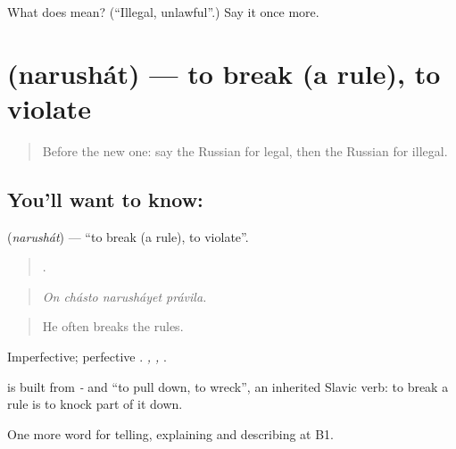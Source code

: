 \begin{tcolorbox}[breakable,colback=teal!4,colframe=teal!35!black,title={Before you move on}]
What does  mean? (\textquotedblleft{}Illegal, unlawful\textquotedblright{}.) Say it once more.
\end{tcolorbox}
\section[\texorpdfstring{\ru{нарушать} (narushát)}{нарушать (narushát)}]{ (narushát) — to break (a rule), to violate}

\label{lesson:RU-C388-narushat}



\begin{quote}
Before the new one: say the Russian for legal, then the Russian for illegal.
\end{quote}

\subsection*{You'll want to know: }
\textbf{} (\emph{narushát}) — \textquotedblleft{}to break (a rule), to violate\textquotedblright{}.

\begin{quote}
   .
\end{quote}

\begin{quote}
\emph{On chásto narusháyet právila.}
\end{quote}

\begin{quote}
He often breaks the rules.
\end{quote}

Imperfective; perfective \emph{}. \emph{ , , }.

\begin{cousinweb}
\textbf{} is built from \emph{-} and \emph{} \textquotedblleft{}to pull down, to wreck\textquotedblright{}, an inherited Slavic verb: to break a rule is to knock part of it down.
\end{cousinweb}

\begin{grammarlens}[title={What you've built}]
One more word for telling, explaining and describing at B1.
\end{grammarlens}

